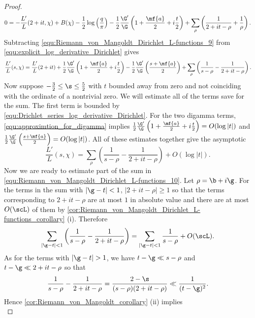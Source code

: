 \begin{proof}
\begin{equation}
          0 = -\frac{L'}{L}(2+it,\chi)+B(\chi)-\frac{1}{2}\log\left(\frac{q}{\pi}\right)-\frac{1}{2}\frac{\G'}{\G}\left(1+\frac{\mf{a}}{2}+i\frac{t}{2}\right)+\sum_{\rho}\left(\frac{1}{2+it-\rho}+\frac{1}{\rho}\right).
        \end{equation}
        Subtracting \cref{equ:Riemann_von_Mangoldt_Dirichlet_L-functions_9} from \cref{equ:explicit_log_derivative_Dirichlet} gives
        \[
          \frac{L'}{L}(s,\chi) = \frac{L'}{L}(2+it)+\frac{1}{2}\frac{\G'}{\G}\left(1+\frac{\mf{a}}{2}+i\frac{t}{2}\right)-\frac{1}{2}\frac{\G'}{\G}\left(\frac{s+\mf{a}}{2}\right)+\sum_{\rho}\left(\frac{1}{s-\rho}-\frac{1}{2+it-\rho}\right).
        \]
        Now suppose $-\frac{3}{2} \le \s \le \frac{5}{2}$ with $t$ bounded away from zero and not coinciding with the ordinate of a nontrivial zero. We will estimate all of the terms save for the sum. The first term is bounded by \cref{equ:Drichlet_series_log_derivative_Dirichlet}. For the two digamma terms, \cref{equ:approximtion_for_digamma} implies $\frac{1}{2}\frac{\G'}{\G}\left(1+\frac{\mf{a}}{2}+i\frac{t}{2}\right) = O(\log|t|)$ and $\frac{1}{2}\frac{\G'}{\G}\left(\frac{s+\mf{a}}{2}\right) = O(\log|t|)$. All of these estimates together give the asymptotic
        \begin{equation}\label{equ:Riemann_von_Mangoldt_Dirichlet_L-functions_10}
          \frac{L'}{L}(s,\chi) = \sum_{\rho}\left(\frac{1}{s-\rho}-\frac{1}{2+it-\rho}\right)+O(\log|t|).
        \end{equation}
        Now we are ready to estimate part of the sum in \cref{equ:Riemann_von_Mangoldt_Dirichlet_L-functions_10}. Let $\rho = \b+i\g$. For the terms in the sum with $|\g-t| < 1$, $|2+it-\rho| \ge 1$ so that the terms corresponding to $2+it-\rho$ are at most $1$ in absolute value and there are at most $O(\scL)$ of them by \cref{cor:Riemann_von_Mangoldt_Dirichlet_L-functions_corollary} (i). Therefore
        \begin{equation}\label{equ:Riemann_von_Mangoldt_Dirichlet_L-functions_11}
          \sum_{|\g-t| < 1}\left(\frac{1}{s-\rho}-\frac{1}{2+it-\rho}\right) = \sum_{|\g-t| < 1}\frac{1}{s-\rho}+O(\scL).
        \end{equation}
        As for the terms with $|\g-t| > 1$, we have $t-\g \ll s-\rho$ and $t-\g \ll 2+it-\rho$ so that
        \[
          \frac{1}{s-\rho}-\frac{1}{2+it-\rho} = \frac{2-\s}{(s-\rho)(2+it-\rho)} \ll \frac{1}{(t-\g)^{2}}.
        \]
        Hence \cref{cor:Riemann_von_Mangoldt_corollary} (ii) implies
        \begin{equation}\label{equ:Riemann_von_Mangoldt_Dirichlet_L-functions_12}

\end{equation}
\end{proof}
